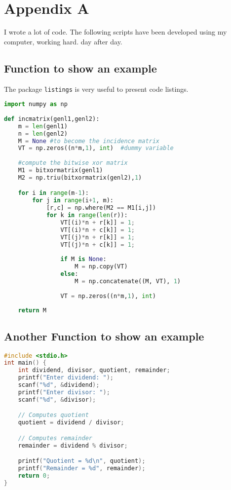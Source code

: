 \chapter*{Appendix A}\label{ch:appendix_a}

I wrote a lot of code. The following scripts have been developed using my computer, working hard. day after day.
\section*{Function to show an example}
The package {\tt listings} is very useful to present code listings.\\
\begin{spacing}{1.0}
{\footnotesize
\begin{lstlisting}[language=Python]
import numpy as np
    
def incmatrix(genl1,genl2):
    m = len(genl1)
    n = len(genl2)
    M = None #to become the incidence matrix
    VT = np.zeros((n*m,1), int)  #dummy variable
    
    #compute the bitwise xor matrix
    M1 = bitxormatrix(genl1)
    M2 = np.triu(bitxormatrix(genl2),1) 

    for i in range(m-1):
        for j in range(i+1, m):
            [r,c] = np.where(M2 == M1[i,j])
            for k in range(len(r)):
                VT[(i)*n + r[k]] = 1;
                VT[(i)*n + c[k]] = 1;
                VT[(j)*n + r[k]] = 1;
                VT[(j)*n + c[k]] = 1;
                
                if M is None:
                    M = np.copy(VT)
                else:
                    M = np.concatenate((M, VT), 1)
                
                VT = np.zeros((n*m,1), int)
    
    return M
\end{lstlisting}
}
\end{spacing}

\section*{Another Function to show an example}
\begin{spacing}{1.0}
{\footnotesize
\begin{lstlisting}[language=C]
#include <stdio.h>
int main() {
    int dividend, divisor, quotient, remainder;
    printf("Enter dividend: ");
    scanf("%d", &dividend);
    printf("Enter divisor: ");
    scanf("%d", &divisor);

    // Computes quotient
    quotient = dividend / divisor;

    // Computes remainder
    remainder = dividend % divisor;

    printf("Quotient = %d\n", quotient);
    printf("Remainder = %d", remainder);
    return 0;
}
\end{lstlisting}
}
\end{spacing}

